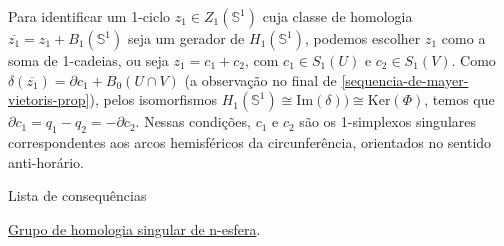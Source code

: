 Para identificar um 1-ciclo $z_1\in Z_1(\mathbb{S}^1)$ cuja classe de homologia $\overline{z_1}=z_1+B_1 (\mathbb{S}^1)$ seja um gerador de $H_1(\mathbb{S}^1)$, podemos escolher $z_1$ como a soma de 1-cadeias, ou seja $z_1=c_1+c_2$, com $c_1\in S_1(U)$ e $c_2\in S_1(V)$. Como $\delta(\overline{z_1})=\partial c_1+B_0(U\cap V)$ (a observação no final de \ref{sequencia-de-mayer-vietoris-prop}), pelos isomorfismos $H_1(\mathbb{S}^1)\cong\text{Im}(\delta))\cong \text{Ker}(\Phi)$, temos que $\partial c_1=q_1-q_2=-\partial c_2$. Nessas condições, $c_1$ e $c_2$ são os 1-simplexos singulares correspondentes aos arcos hemisféricos da circunferência, orientados no sentido anti-horário.


\begin{titlemize}{Lista de consequências}
    \item \hyperref[grupo-de-homologia-singular-de-n-esfera-prop]{Grupo de homologia singular de n-esfera}.\\
\end{titlemize}
